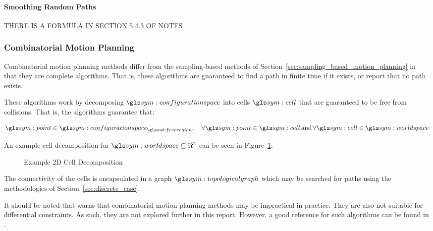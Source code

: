 			\paragraph{Smoothing Random Paths}%
			\label{sec:smoothing_random_paths}

				THERE IS A FORMULA IN SECTION 5.4.3 OF NOTES

		\subsubsection{Combinatorial Motion Planning}%
		\label{sec:combinatorial_motion_planning}

			Combinatorial motion planning methods differ from the sampling-based
			methods of Section~\ref{sec:sampling_based_motion_planning} in that
			they are complete algorithms. That is, these algorithms are
			guaranteed to find a path in finite time if it exists, or report
			that no path exists.

			These algorithms work by decomposing $\configurationspace$ into
			cells $\cell$ that are guaranteed to be free from collisions. That
			is, the algorithms guarantee that:

			\begin{equation}
				\point\in\configurationspace_{\freeregion},
				\quad
				\forall\point\in\cell \, \text{and} \, \forall\cell\in\world
			\end{equation}

			An example cell decomposition for $\world\subseteq\Re^2$ can be seen
			in Figure~\ref{fig:example_2d_cell_decomposition}.

			\begin{figure}[hb]
				\caption{Example 2D Cell Decomposition}%
				\label{fig:example_2d_cell_decomposition}
			\end{figure}

			The connectivity of the cells is encapsulated in a graph
			$\topologicalgraph$ which may be searched for paths using the
			methodologies of Section~\ref{sec:discrete_case}.

			It should be noted that  warns that
			combinatorial motion planning methods may be impractical in
			practice. They are also not suitable for differential constraints.
			As such, they are not explored further in this report. However, a
			good reference for such algorithms can be found in .


